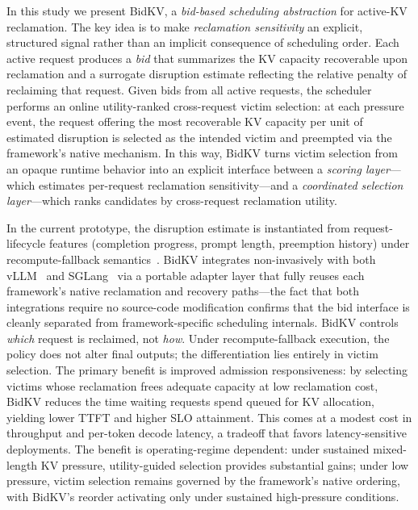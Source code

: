 \documentclass[sigconf,nonacm]{acmart}
\newcommand{\bidkv}{BidKV\xspace}
\begin{document}
In this study we present \bidkv, a \emph{bid-based scheduling abstraction} for
active-KV reclamation.  The key idea is to make \emph{reclamation sensitivity} an
explicit, structured signal rather than an implicit consequence of scheduling
order.  Each active request produces a \emph{bid} that summarizes the KV
capacity recoverable upon reclamation and a surrogate disruption estimate
reflecting the relative penalty of reclaiming that request.  Given bids from all active requests, the scheduler performs an online
utility-ranked cross-request victim selection: at each pressure event, the
request offering the most recoverable KV capacity per unit of estimated
disruption is selected as the intended victim and preempted via the
framework's native mechanism.  In this way, \bidkv turns victim
selection from an opaque runtime behavior into an explicit interface between a
\emph{scoring layer}---which estimates per-request reclamation
sensitivity---and a \emph{coordinated selection layer}---which ranks candidates by
cross-request reclamation utility.

In the current prototype, the disruption estimate is instantiated from
request-lifecycle features (completion progress, prompt length, preemption
history) under recompute-fallback semantics~\cite{Kwon2023}.
\bidkv integrates non-invasively with both vLLM~\cite{Kwon2023} and
SGLang~\cite{Zheng2024sglang} via a portable adapter layer that fully reuses
each framework's native reclamation and recovery paths---the fact that both
integrations require no source-code modification confirms that the bid
interface is cleanly separated from framework-specific scheduling internals.
\bidkv controls \emph{which} request is reclaimed, not \emph{how}.  Under
recompute-fallback execution, the policy does not alter final outputs; the
differentiation lies entirely in victim selection.  The primary benefit is
improved admission responsiveness: by selecting victims whose reclamation
frees adequate capacity at low reclamation cost, \bidkv reduces the time
waiting requests spend queued for KV allocation, yielding lower TTFT and
higher SLO attainment.  This comes at a modest cost in throughput and
per-token decode latency, a tradeoff that favors latency-sensitive
deployments.  The benefit is operating-regime dependent: under sustained
mixed-length KV pressure, utility-guided selection provides substantial
gains; under low pressure, victim selection remains governed by the
framework's native ordering, with \bidkv's reorder activating only under
sustained high-pressure conditions.
\end{document}
